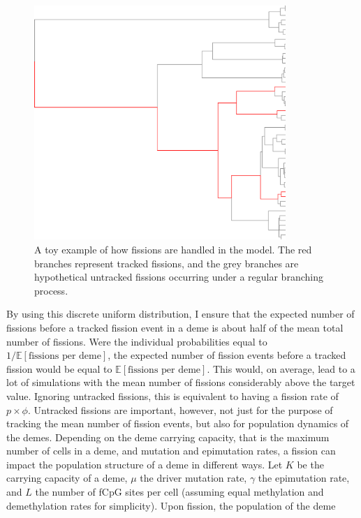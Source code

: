 \begin{figure}[h]
    \centering
    \includegraphics[width=0.85\textwidth]{Chapter_4/figures/example_branching.pdf}
    \caption{A toy example of how fissions are handled in the model. The red
    branches represent tracked fissions, and the grey branches are hypothetical
    untracked fissions occurring under a regular branching process.}
    \label{fig:fission_explainer}
\end{figure}
By using this discrete uniform distribution, I ensure that the expected number
of fissions before a tracked fission event in a deme is about half of the mean
total number of fissions. Were the individual probabilities equal to
$1/\mathbb{E}[\text{fissions per deme}]$, the expected number of fission events
before a tracked fission would be equal to $\mathbb{E}[\text{fissions per
deme}]$. This would, on average, lead to a lot of simulations with the mean
number of fissions considerably above the target value. Ignoring untracked
fissions, this is equivalent to having a fission rate of $p\times\phi$.
Untracked fissions are important, however, not just for the purpose of tracking
the mean number of fission events, but also for population dynamics of the
demes. Depending on the deme carrying capacity, that is the maximum number of
cells in a deme, and mutation and epimutation rates, a fission can impact the
population structure of a deme in different ways. Let $K$ be the carrying
capacity of a deme, $\mu$ the driver mutation rate, $\gamma$ the epimutation
rate, and $L$ the number of fCpG sites per cell (assuming equal methylation and
demethylation rates for simplicity). Upon fission, the population of the deme
